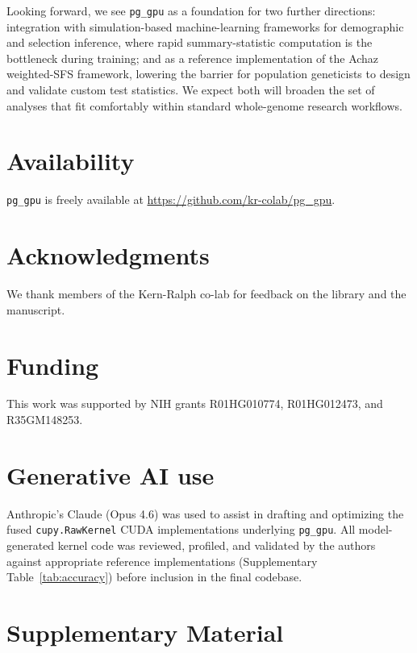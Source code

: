 \documentclass[12pt]{article}
\newcommand{\citep}{\parencite}
\newcommand{\pggpu}{\texttt{pg\_gpu}\xspace}
\newcommand{\beginsupplement}{%
    \setcounter{table}{0}
    \renewcommand{\thetable}{S\arabic{table}}%
    \setcounter{figure}{0}
    \renewcommand{\thefigure}{S\arabic{figure}}%
    \renewcommand{\theHtable}{supp.\arabic{table}}%
    \renewcommand{\theHfigure}{supp.\arabic{figure}}%
}
\begin{document}
Looking forward, we see \pggpu as a foundation for two further
directions: integration with simulation-based machine-learning
frameworks for demographic and selection inference, where rapid
summary-statistic computation is the bottleneck during training;
and as a reference implementation of the Achaz \citep{achaz2009}
weighted-SFS framework, lowering the barrier for population
geneticists to design and validate custom test statistics. We expect
both will broaden the set of analyses that fit comfortably within
standard whole-genome research workflows.

\section*{Availability}

\pggpu is freely available at \url{https://github.com/kr-colab/pg_gpu}.

\section*{Acknowledgments}

We thank members of the Kern-Ralph co-lab for feedback on the library and the manuscript.

\section*{Funding}

This work was supported by NIH grants R01HG010774, R01HG012473, and R35GM148253.


\section*{Generative AI use}

Anthropic's Claude (Opus 4.6) was used to assist in drafting and
optimizing the fused \texttt{cupy.RawKernel} CUDA implementations
underlying \pggpu. All model-generated kernel code was reviewed,
profiled, and validated by the authors against appropriate
reference implementations (Supplementary Table~\ref{tab:accuracy})
before inclusion in the final codebase.



\printbibliography

\clearpage
\beginsupplement

\section*{Supplementary Material}
\end{document}
